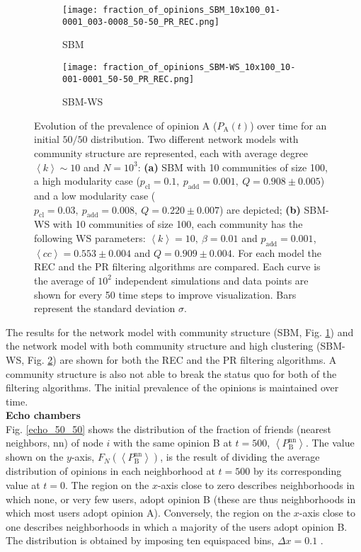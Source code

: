 \documentclass[11 pt , letterpaper , twoside , openright]{book}
\begin{document}
\begin{figure}[H]
  \begin{subfigure}[b]{0.49\textwidth}
    \caption{SBM}
    \texttt{[image: fraction\_of\_opinions\_SBM\_10x100\_01-0001\_003-0008\_50-50\_PR\_REC.png]}
    \label{sbm_50-50}
  \end{subfigure}
  \begin{subfigure}[b]{0.49\textwidth}
    \caption{SBM-WS}
    \texttt{[image: fraction\_of\_opinions\_SBM-WS\_10x100\_10-001-0001\_50-50\_PR\_REC.png]}
    \label{sbm-ws_50-50}
  \end{subfigure}
  \captionsetup{format=plain}
  \caption[Evolution of the prevalence of opinion A ($P_{\text{A}}(t)$) over time for an initial $50/50$ opinion distribution.]{Evolution of the prevalence of opinion A ($P_{\text{A}}(t)$) over time for an initial $50/50$ distribution. Two different network models with community structure are represented, each with average degree $\left<k\right> \sim 10$ and $N = 10^3$: \textbf{(a)} SBM with 10 communities of size 100, a high modularity case ($p_{\text{cl}} = 0.1,\ p_{\text{add}} = 0.001,\ Q = 0.908 \pm 0.005$) and a low modularity case ($p_{\text{cl}} = 0.03,\ p_{\text{add}} = 0.008,\ Q = 0.220 \pm 0.007$) are depicted; \textbf{(b)} SBM-WS with 10 communities of size 100, each community has the following WS parameters: $\left<k\right> = 10,\ \beta = 0.01$ and $p_{\text{add}} = 0.001$, $\left<cc\right> = 0.553 \pm 0.004$ and $Q = 0.909 \pm 0.004$. For each model the REC and the PR filtering algorithms are compared. Each curve is the average of $10^2$ independent simulations and data points are shown for every 50 time steps to improve visualization. Bars represent the standard deviation $\sigma$.}
\label{ev_op_50_50}
\end{figure}
\noindent
The results for the network model with community structure (SBM, Fig. \ref{sbm_50-50}) and the network model with both community structure and high clustering (SBM-WS, Fig. \ref{sbm-ws_50-50}) are shown for both the REC and the PR filtering algorithms. A community structure is also not able to break the status quo for both of the filtering algorithms. The initial prevalence of the opinions is maintained over time.\\
\newline
\textbf{Echo chambers}\\
\newline
Fig. \ref{echo_50_50} shows the distribution of the fraction of friends (nearest neighbors, nn) of node $i$ with the same opinion B at $t=500$, $\left<P_{\text{B}}^{\text{nn}}\right>$. The value shown on the $y$-axis, $F_N(\left<P_{\text{B}}^{\text{nn}}\right>)$, is the result of dividing the average distribution of opinions in each neighborhood at $t=500$ by its corresponding value at $t=0$. The region on the $x$-axis close to zero describes neighborhoods in which none, or very few users, adopt opinion B (these are thus neighborhoods in which most users adopt opinion A). Conversely, the region on the $x$-axis close to one describes neighborhoods in which a majority of the users adopt opinion B. The distribution is obtained by imposing ten equispaced bins, $\Delta x = 0.1$ \cite{Perra2019}. 
\end{document}
